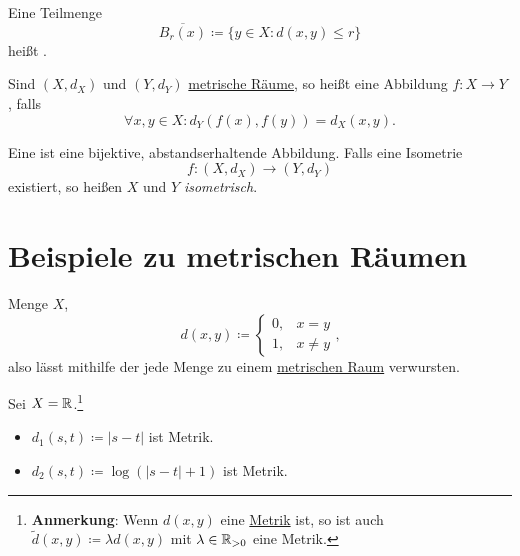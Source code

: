 \begin{definition}
  \label{def:abgeschlossenerBall}
  Eine Teilmenge
  \begin{equation*}
    \overline{B_r(x)} \coloneqq \{ y \in X : d(x,y) \leq r \}
  \end{equation*}
  heißt .
\end{definition}

\begin{definition}
  \label{def:abstandserhaltendeAbbildung}
  Sind $ (X, d_X) $ und $ (Y, d_Y) $ \hyperref[def:metrischerRaum]{metrische Räume}, so heißt eine Abbildung $ f: X \to Y $ , falls
  \begin{equation*}
    \forall x, y \in X: d_Y(f(x), f(y)) = d_X(x, y)\text{.}
  \end{equation*}
\end{definition}

\begin{definition}[Isometrie] 
  \label{def:isometrie}
  Eine  ist eine bijektive, abstandserhaltende Abbildung. Falls eine Isometrie
  \begin{equation*}
    f: (X, d_X) \to (Y, d_Y)
  \end{equation*}
  existiert, so heißen $ X $ und $ Y $ \emph{isometrisch}.
\end{definition}

\section{Beispiele zu metrischen Räumen}

\begin{example}
  \label{bsp:trivialeMetrik}
  Menge $ X $,
  \begin{equation*}
    d(x, y) \coloneqq \begin{cases}
    0, &x = y \\
    1, & x \neq y
  \end{cases}\text{,}
  \end{equation*}
  also lässt mithilfe der  jede Menge zu einem \hyperref[def:metrischerRaum]{metrischen Raum} verwursten. 
\end{example}

\begin{example}
  \label{bsp:simpleMetriken}
  Sei $ X = \mathbb{R} $.\footnote{\textbf{Anmerkung}: Wenn $ d(x, y) $ eine \hyperref[def:metrik]{Metrik} ist, so ist auch $ \widetilde{d}(x, y) \coloneqq \lambda d(x, y) $ mit $ \lambda \in \mathbb{R}_{>0} $ eine Metrik.}
  \begin{itemize}
    \item $ d_1(s, t) \coloneqq |s-t| $ ist Metrik.
    \item $ d_2(s, t) \coloneqq \log(|s-t|+1) $ ist Metrik.
  \end{itemize}
\end{example}

